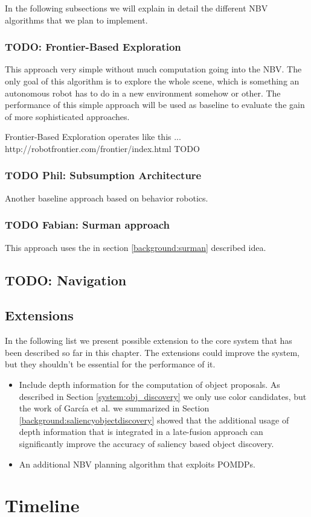 \documentclass[a4paper,11pt,english]{article}
\begin{document}
In the following subsections we will explain in detail the different NBV algorithms that we plan to implement.

\subsubsection{TODO: Frontier-Based Exploration}
This approach very simple without much computation going into the NBV.
The only goal of this algorithm is to explore the whole scene, which is something an autonomous robot has to do in a new environment somehow or other.
The performance of this simple approach will be used as baseline to evaluate the gain of more sophisticated approaches.

Frontier-Based Exploration operates like this ... http://robotfrontier.com/frontier/index.html
TODO

\subsubsection{TODO Phil: Subsumption Architecture}
Another baseline approach based on behavior robotics.

\subsubsection{TODO Fabian: Surman approach}
This approach uses the in section \ref{background:surman} described idea.

\subsection{TODO: Navigation}
\label{system:navigation}
\subsection{Extensions}
\label{system:extensions}
In the following list we present possible extension to the core system that has been described so far in this chapter. 
The extensions could improve the system, but they shouldn't be essential for the performance of it.

\begin{itemize}
	\item Include depth information for the computation of object proposals.
	As described in Section \ref{system:obj_discovery} we only use color candidates, but the work of García et al. we summarized in Section \ref{background:saliencyobjectdiscovery} showed that the additional usage of depth information that is integrated in a late-fusion approach can significantly improve the accuracy of saliency based object discovery.
	\item An additional NBV planning algorithm that exploits POMDPs.
\end{itemize}

\section{Timeline}
\label{timeline}

\newpage


\end{document}
